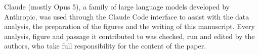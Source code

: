 \documentclass[ResearchPaper,linenum]{CSIRO_LaTeX_Template}
\begin{document}
\begin{framedbox}

Claude (mostly Opus 5), a family of large language models developed by Anthropic, was used
through the Claude Code interface to assist with the data analysis, the preparation of the
figures and the writing of this manuscript. Every analysis, figure and passage it contributed
to was checked, run and edited by the authors, who take full responsibility for the content of
the paper.

\end{framedbox}
\end{document}
